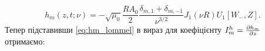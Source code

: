 %
%
%
\begin{equation} \label{eq:hm_lommel}
h_m (z, t; \nu) = - \sqrt{\mu_0} \frac{R A_0}{2} 
\frac{\delta_{m,1} + \delta_{m,-1}}
{\nu^{3/2}} J_1 (\nu R) U_1 \left[ W_-, Z \right].
\end{equation}
%
Тепер підставивши \eqref{eq:hm_lommel} в вираз для коефіцієнту
$ I_{m}^{h} = \frac{\partial h_m}{\partial z} $ отримаємо:
%
%
%
